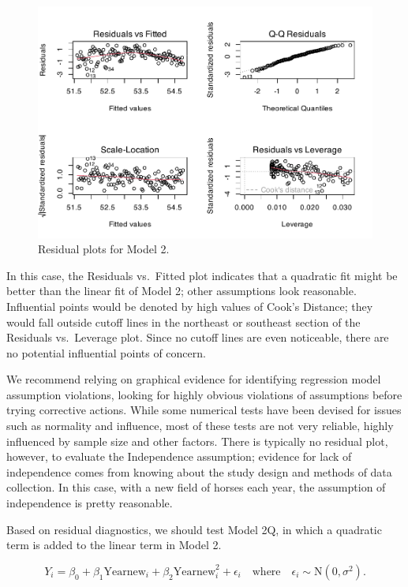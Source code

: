 \documentclass[
]{krantz}
\begin{document}
\begin{figure}

{\centering \includegraphics[width=0.9\linewidth]{bookdown-BeyondMLR_files/figure-latex/resid2-1} 

}

\caption{Residual plots for Model 2.}\label{fig:resid2}
\end{figure}

In this case, the Residuals vs.~Fitted plot indicates that a quadratic fit might be better than the linear fit of Model 2; other assumptions look reasonable. Influential points would be denoted by high values of Cook's Distance; they would fall outside cutoff lines in the northeast or southeast section of the Residuals vs.~Leverage plot. Since no cutoff lines are even noticeable, there are no potential influential points of concern.

We recommend relying on graphical evidence for identifying regression model assumption violations, looking for highly obvious violations of assumptions before trying corrective actions. While some numerical tests have been devised for issues such as normality and influence, most of these tests are not very reliable, highly influenced by sample size and other factors. There is typically no residual plot, however, to evaluate the Independence assumption; evidence for lack of independence comes from knowing about the study design and methods of data collection. In this case, with a new field of horses each year, the assumption of independence is pretty reasonable.

Based on residual diagnostics, we should test Model 2Q, in which a quadratic term is added to the linear term in Model 2.

\begin{equation*}
Y_{i}=\beta_{0}+\beta_{1}\textrm{Yearnew}_{i}+\beta_{2}\textrm{Yearnew}^2_{i}+\epsilon_{i}\quad \textrm{where}\quad \epsilon_{i}\sim \textrm{N}(0,\sigma^2).
\end{equation*}
\end{document}
